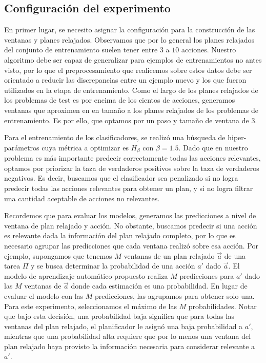 \subsection{Configuración del experimento}

En primer lugar, se necesito asignar la configuración para la construcción de las ventanas y planes relajados.  Observamos que
por lo general los planes relajados del conjunto de entrenamiento suelen tener
entre $3$ a $10$ acciones. Nuestro algoritmo debe ser capaz de generalizar para
ejemplos de entrenamientos no antes visto, por lo que el preprocesamiento que
realicemos sobre estos datos debe ser orientado a reducir las discrepancias
entre un ejemplo nuevo y los que fueron utilizados en la etapa de entrenamiento.
Como el largo de los planes relajados de los problemas de test es por encima de los cientos de acciones, generamos ventanas que aproximen en
en tamaño a los planes relajados de los problemas de entrenamiento. Es por ello, que optamos por un paso y tamaño de ventana de $3$.

Para el entrenamiento de los clasificadores, se realizó una búsqueda de
hiper-parámetros cuya métrica a optimizar es $H_{\beta}$ con $\beta = 1.5$. Dado
que en nuestro problema es más importante predecir correctamente todas las
acciones relevantes, optamos por priorizar la taza de verdaderos positivos sobre
la taza de verdaderos negativos. Es decir, buscamos que el clasificador sea
penalizado si no logra predecir todas las acciones relevantes para obtener un
plan, y si no logra filtrar una cantidad aceptable de acciones no relevantes.

Recordemos que para evaluar los modelos, generamos las predicciones a nivel de
ventana de plan relajado y acción. No obstante, buscamos predecir si una acción
es relevante dada la información del plan relajado completo, por lo que es
necesario agrupar las predicciones que cada ventana realizó sobre esa acción.
Por ejemplo, supongamos que tenemos $M$ ventanas de un plan relajado $\vec{a}$
de una tarea $\Pi$ y se busca determinar la probabilidad de una acción $a'$ dado
$\vec{a}$. El modelo de aprendizaje automático propuesto realiza $M$
predicciones para $a'$ dado las $M$ ventanas de $\vec{a}$ donde cada estimación
es una probabilidad. En lugar de evaluar el modelo con las $M$ predicciones, las
agrupamos para obtener solo una. Para este experimento, seleccionamos el máximo
de las $M$ probabilidades. Notar que bajo esta decisión, una probabilidad baja
significa que para todas las ventanas del plan relajado, el planificador le
asignó una baja probabilidad a $a'$, mientras que una probabilidad alta requiere
que por lo menos una ventana del plan relajado haya provisto la información
necesaria para considerar relevante a $a'$.

